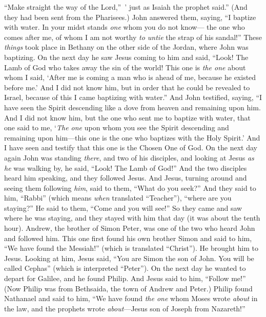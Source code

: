 \begin{biblechapter}
“Make straight the way of the Lord,” ’
\verse just as Isaiah the prophet said.”
\verse (And they had been sent from the Pharisees.)
\verse John answered them, saying, “I baptize with water. In your midst stands \textit{one} whom you do not know—
\verse the one who comes after me, of whom I am not worthy \textit{to untie} the strap of his sandal!”
\verse These \textit{things} took place in Bethany on the other side of the Jordan, where John was baptizing.
\verse On the next day he saw Jesus coming to him and said, “Look! The Lamb of God who takes away the sin of the world!
\verse This one is \textit{the one} about whom I said, ‘After me is coming a man who is ahead of me, because he existed before me.’
\verse And I did not know him, but in order that he could be revealed to Israel, because of this I came baptizing with water.”
\verse And John testified, saying, “I have seen the Spirit descending like a dove from heaven and remaining upon him.
\verse And I did not know him, but the one who sent me to baptize with water, that one said to me, ‘\textit{The one} upon whom you see the Spirit descending and remaining upon him—this one is the one who baptizes with the Holy Spirit.’
\verse And I have seen and testify that this one is the Chosen One of God.
 On the next day again John was standing \textit{there}, and two of his disciples,
\verse and looking at Jesus \textit{as he} was walking by, he said, “Look! The Lamb of God!”
\verse And the two disciples heard him speaking, and they followed Jesus.
\verse And Jesus, turning around and seeing them following \textit{him}, said to them, “What do you seek?” And they said to him, “Rabbi” (which means \textit{when} translated “Teacher”), “where are you staying?”
\verse He said to them, “Come and you will see!” So they came and saw where he was staying, and they stayed with him that day (it was about the tenth hour).
 Andrew, the brother of Simon Peter, was one of the two who heard John and followed him.
\verse This one first found his own brother Simon and said to him, “We have found the Messiah!” (which is translated “Christ”).
\verse He brought him to Jesus. Looking at him, Jesus said, “You are Simon the son of John. You will be called Cephas” (which is interpreted “Peter”).
 On the next day he wanted to depart for Galilee, and he found Philip. And Jesus said to him, “Follow me!”
\verse (Now Philip was from Bethsaida, the town of Andrew and Peter.)
\verse Philip found Nathanael and said to him, “We have found \textit{the one} whom Moses wrote \textit{about} in the law, and the prophets wrote \textit{about}—Jesus son of Joseph from Nazareth!”

\end{biblechapter}
